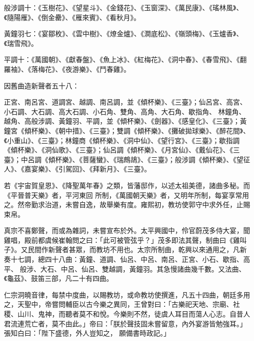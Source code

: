 \begin{pinyinscope}
 般涉調十：《玉樹花》、《望星斗》、《金錢花》、《玉窗深》、《萬民康》、《瑤林風》、《隨陽雁》、《倒金罍》、《雁來賓》、《看秋月》。



 黃鐘羽七：《宴鄒枚》、《雲中樹》、《燎金爐》、《澗底松》、《嶺頭梅》、《玉爐香》、《瑞雪飛》。



 平調十：《萬國朝》、《獻春盤》、《魚上冰》、《紅梅花》、《洞中春》、《春雪飛》、《翻羅袖》、《落梅花》、《夜游樂》、《鬥春雞》。



 因舊曲造新聲者五十八：



 正宮、南呂宮、道調宮、越調、南呂調，並《傾杯樂》、《三臺》；仙呂宮、高宮、小石調、大石調、高大石調、小石角、雙角、高角、大石角、歇指角、
 林鐘角、越角、高般涉調、黃鐘羽、平調，並《傾杯樂》、《劍器》、《感皇化》、《三臺》；黃鐘宮《傾杯樂》、《朝中措》、《三臺》；雙調《傾杯樂》、《攤破拋球樂》、《醉花間》、《小重山》、《三臺》；林鐘商《傾杯樂》、《洞中仙》、《望行宮》、《三臺》；歇指調《傾杯樂》、《洞仙歌》、《三臺》；仙呂調《傾杯樂》、《月宮仙》、《戴仙花》、《三臺》；中呂調《傾杯樂》、《菩薩蠻》、《瑞鷓鴣》、《三臺》；般涉調《傾杯樂》、《望征人》、《嘉宴樂》、《引駕回》、《拜新月》、《三臺》。



 若《宇宙賀皇恩》、《降聖萬年春》之類，皆藩邸作，以述太祖美德，諸曲多秘。而《平晉普天樂》者，平河東回
 所制，《萬國朝天樂》者，又明年所制，每宴享常用之。然帝勤求治道，未嘗自逸，故舉樂有度。雍熙初，教坊使郭守中求外任，止賜束帛。



 真宗不喜鄭聲，而或為雜詞，未嘗宣布於外。太平興國中，伶官蔚茂多侍大宴，聞雞唱，殿前都虞候崔翰問之曰：「此可被管弦乎？」茂多即法其聲，制曲曰《雞叫子》。又民間作新聲者甚眾，而教坊不用也。太宗所制曲，乾興以來通用之，凡新奏十七調，總四十八曲：黃鐘、道調、仙呂、中呂、南呂、正宮、小石、歇指、高平、
 般涉、大石、中呂、仙呂、雙越調，黃鐘羽。其急慢諸曲幾千數。又法曲、《龜茲》、鼓笛三部，凡二十有四曲。



 仁宗洞曉音律，每禁中度曲，以賜教坊，或命教坊使撰進，凡五十四曲，朝廷多用之，天聖中，帝嘗問輔臣以古今樂之異同，王曾對曰：「古樂祀天地、宗廟、社稷、山川、鬼神，而聽者莫不和悅。今樂則不然，徒虞人耳目而蕩人心志。自昔人君流連荒亡者，莫不由此。」帝曰：「朕於聲技固未嘗留意，內外宴游皆勉強耳。」張知白曰：「陛下盛德，外人豈知之，
 願備書時政記。」




\end{pinyinscope}
